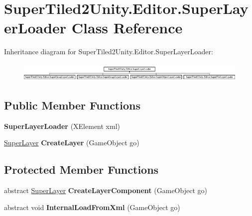 \hypertarget{class_super_tiled2_unity_1_1_editor_1_1_super_layer_loader}{}\section{Super\+Tiled2\+Unity.\+Editor.\+Super\+Layer\+Loader Class Reference}
\label{class_super_tiled2_unity_1_1_editor_1_1_super_layer_loader}
Inheritance diagram for Super\+Tiled2\+Unity.\+Editor.\+Super\+Layer\+Loader\+:\begin{figure}[H]
\begin{center}
\leavevmode
\includegraphics[height=0.930233cm]{class_super_tiled2_unity_1_1_editor_1_1_super_layer_loader}
\end{center}
\end{figure}
\subsection*{Public Member Functions}
\begin{DoxyCompactItemize}
\item 
\mbox{\label{class_super_tiled2_unity_1_1_editor_1_1_super_layer_loader_a4ebfdf1ea7459f208924b604ee69951c}} 
{\bfseries Super\+Layer\+Loader} (X\+Element xml)
\item 
\mbox{\label{class_super_tiled2_unity_1_1_editor_1_1_super_layer_loader_aec1294bb100318e39391cd045ac18204}} 
\mbox{\hyperlink{class_super_tiled2_unity_1_1_super_layer}{Super\+Layer}} {\bfseries Create\+Layer} (Game\+Object go)
\end{DoxyCompactItemize}
\subsection*{Protected Member Functions}
\begin{DoxyCompactItemize}
\item 
\mbox{\label{class_super_tiled2_unity_1_1_editor_1_1_super_layer_loader_a2fd719d1681773f07f8b960b44a24268}} 
abstract \mbox{\hyperlink{class_super_tiled2_unity_1_1_super_layer}{Super\+Layer}} {\bfseries Create\+Layer\+Component} (Game\+Object go)
\item 
\mbox{\label{class_super_tiled2_unity_1_1_editor_1_1_super_layer_loader_a900087617ed5cdba271bc92a3066fc05}} 
abstract void {\bfseries Internal\+Load\+From\+Xml} (Game\+Object go)
\end{DoxyCompactItemize}
